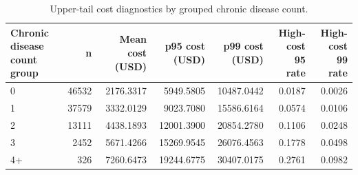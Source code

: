 \begin{table}
\caption{Upper-tail cost diagnostics by grouped chronic disease count.}
\label{tab:02-tail-by-chronic-count}
\begin{tabular}{lrrrrrr}
\toprule
Chronic disease count group & n & Mean cost (USD) & p95 cost (USD) & p99 cost (USD) & High-cost 95 rate & High-cost 99 rate \\
\midrule
0 & 46532 & 2176.3317 & 5949.5805 & 10487.0442 & 0.0187 & 0.0026 \\
1 & 37579 & 3332.0129 & 9023.7080 & 15586.6164 & 0.0574 & 0.0106 \\
2 & 13111 & 4438.1893 & 12001.3900 & 20854.2780 & 0.1106 & 0.0248 \\
3 & 2452 & 5671.4266 & 15269.9545 & 26076.4563 & 0.1778 & 0.0498 \\
4+ & 326 & 7260.6473 & 19244.6775 & 30407.0175 & 0.2761 & 0.0982 \\
\bottomrule
\end{tabular}
\end{table}
